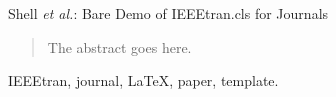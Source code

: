 \documentclass[journal]{IEEEtran}
\begin{document}
%
{Shell \MakeLowercase{\textit{et al.}}: Bare Demo of IEEEtran.cls for Journals}
% 











\maketitle

\begin{abstract}
The abstract goes here.
\end{abstract}

\begin{IEEEkeywords}
IEEEtran, journal, \LaTeX, paper, template.
\end{IEEEkeywords}






%
\IEEEpeerreviewmaketitle
\end{document}
